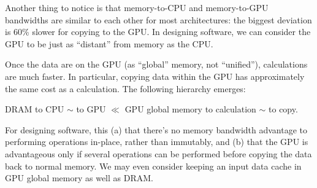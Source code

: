 \documentclass[12pt]{article}
\begin{document}


Another thing to notice is that memory-to-CPU and memory-to-GPU bandwidths are similar to each other for most architectures: the biggest deviation is 60\% slower for copying to the GPU. In designing software, we can consider the GPU to be just as ``distant'' from memory as the CPU.

Once the data are on the GPU (as ``global'' memory, not ``unified''), calculations are much faster. In particular, copying data within the GPU has approximately the same cost as a calculation. The following hierarchy emerges:
\begin{center}
DRAM to CPU $\sim$ to GPU $\ll$ GPU global memory to calculation $\sim$ to copy.
\end{center}
For designing software, this (a) that there's no memory bandwidth advantage to performing operations in-place, rather than immutably, and (b) that the GPU is advantageous only if several operations can be performed before copying the data back to normal memory. We may even consider keeping an input data cache in GPU global memory as well as DRAM.
\end{document}
